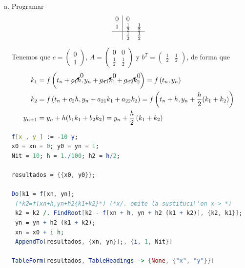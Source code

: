 \begin{enumerate}[a)]
\begin{sol}
\vspace{0.3cm}
\noindent\textbf{Conclusión:} \\
La región de estabilidad es \textbf{todo el plano complejo excluyendo el interior del disco abierto de radio 1 centrado en $z = 1$}. Al contener completamente el semiplano izquierdo ($\text{Re}(z) \le 0$), se trata de un método \textit{A-estable} (incondicionalmente estable para problemas disipativos), lo que es característico de los métodos implícitos.
\end{sol}
\item Programar
$$\begin{array}{c|cc}
0 & 0 \\
1 & \frac{1}{2} & \frac{1}{2} \\
\hline
  & \frac{1}{2} & \frac{1}{2}
\end{array}$$
\begin{sol}
    Tenemos que $c=\begin{pmatrix} 0 \\ 1 \end{pmatrix}$, $A = \begin{pmatrix} 0 & 0 \\ \frac{1}{2} & \frac{1}{2} \end{pmatrix}$ y $b^T = \begin{pmatrix} \frac{1}{2} & \frac{1}{2} \end{pmatrix}$, de forma que
    \begin{align*}
    k_1 &  =   f\left(t_n + \cancelto{0}{c_{1}} h, y_n + \cancelto{0}{a_{11}} k_1 + \cancelto{0}{a_{12}} k_2 \right) =f\left(t_n, y_n \right) \\
    k_2 & =   f\left(t_n + c_2 h, y_n + a_{21} k_1 + a_{22} k_2 \right)=  f\left(t_n + h, y_n + \frac{h}{2} (k_1 + k_2)\right) \\
    y_{n+1} &  = y_n + h (b_1 k_1 + b_2 k_2) = y_n + \frac{h}{2} \left( k_1+k_2 \right) 
    \end{align*}
\begin{lstlisting}[language=Mathematica]
f[x_, y_] := -10 y;
x0 = xn = 0; y0 = yn = 1;
Nit = 10; h = 1./100; h2 = h/2;

resultados = {{x0, y0}};

Do[k1 = f[xn, yn];
 (*k2=f[xn+h,yn+h2{k1+k2}*) (*x/. omite la sustituci\'on x-> *)
 k2 = k2 /. FindRoot[k2 - f[xn + h, yn + h2 (k1 + k2)], {k2, k1}];
 yn = yn + h2 (k1 + k2);
 xn = x0 + i h;
 AppendTo[resultados, {xn, yn}];, {i, 1, Nit}]

TableForm[resultados, TableHeadings -> {None, {"x", "y"}}]
\end{lstlisting}
\end{sol}
\end{enumerate}
